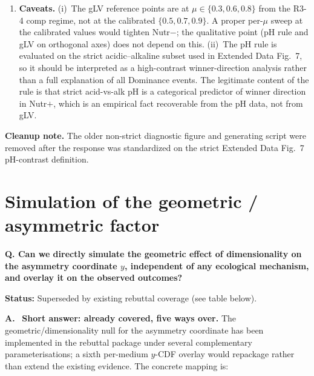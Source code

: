 \documentclass[11pt]{article}
\newcommand{\question}[1]{%
    \par\vspace{0.4em}\noindent%
    {\color{blue!70!black}\textbf{Q. #1}}\par\smallskip%
}
\newcommand{\answerlabel}{\par\noindent\textbf{A.}\ }
\newcommand{\statusmark}[1]{{\color{red!70!black}\textbf{Status:} #1}\par}
\begin{document}
\begin{enumerate}[itemsep=2pt]
    \item \textbf{Caveats.}
    (i)~The gLV reference points are at $\mu \in \{0.3, 0.6, 0.8\}$ from the R3-4 comp regime, not at the calibrated $\{0.5, 0.7, 0.9\}$. A proper per-$\mu$ sweep at the calibrated values would tighten Nutr$-$; the qualitative point (pH rule and gLV on orthogonal axes) does not depend on this.
    (ii)~The pH rule is evaluated on the strict acidic--alkaline subset used in Extended Data Fig.~7, so it should be interpreted as a high-contrast winner-direction analysis rather than a full explanation of all Dominance events. The legitimate content of the rule is that strict acid-vs-alk pH is a categorical predictor of winner direction in Nutr$+$, which is an empirical fact recoverable from the pH data, not from gLV.
\end{enumerate}

\textbf{Cleanup note.} The older non-strict diagnostic figure and generating script were removed after the response was standardized on the strict Extended Data Fig.~7 pH-contrast definition.

\section{Simulation of the geometric / asymmetric factor}
\label{sec:q4_geometric_factor}

\question{Can we directly simulate the geometric effect of dimensionality on the asymmetry coordinate $y$, independent of any ecological mechanism, and overlay it on the observed outcomes?}
\statusmark{Superseded by existing rebuttal coverage (see table below).}

\answerlabel
\textbf{Short answer: already covered, five ways over.} The geometric/dimensionality null for the asymmetry coordinate has been implemented in the rebuttal package under several complementary parameterisations; a sixth per-medium $y$-CDF overlay would repackage rather than extend the existing evidence. The concrete mapping is:
\end{document}
